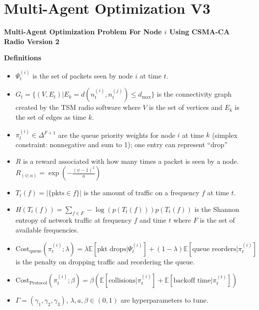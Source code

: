\documentclass{article}
\begin{document}
\newpage

\section{Multi-Agent Optimization V3}

\noindent \textbf{Multi-Agent Optimization Problem For Node $i$ Using CSMA-CA Radio Version 2}
\\
\noindent{}

\vspace{1 cm}


\textbf{Definitions}
\begin{itemize}
    \item $\Psi_{t}^{(i)}$ is the set of packets seen by node $i$ at time $t$.
    \item $G_{t} = \{ (V, E_{t}) | E_{k} = d(n_{t}^{(i)}, n_{t}^{(j)}) \le d_{\text{max}} \}$ is the connectivity graph created by the TSM radio software where $V$ is the set of vertices and $E_{k}$ is the set of edges as time $k$.
    \item $\pi_{t}^{(i)}\in\Delta^{F+1}$ are the queue priority weights for node $i$ at time $k$ (simplex constraint: nonnegative and sum to 1); one entry can represent ``drop''
    \item $R$ is a reward associated with how many times a packet is seen by a node. $R_(\psi; a) = \exp(- \frac{(\psi - 1)^{2}}{a})$
    \item $T_{t}(f) = | \{ \text{pkts} \in f\} |$ is the amount of traffic on a frequency $f$ at time $t$.
    \item $H(T_{t}(f))= \sum _{f \in F} -\log(p(T_{t}(f))) p(T_{t}(f))$ is the Shannon entropy of network traffic at frequency $f$ and time $t$ where $F$ is the set of available frequencies.
    \item $\text{Cost}_{\text{queue}}(\pi_{t}^{(i)}; \lambda) = \lambda \mathbb{E}[\text{pkt drops}| \Psi_{t}^{(i)}] + (1 - \lambda) \mathbb{E}[\text{queue reorders}| \pi_{t}^{(i)}]$ is the penalty on dropping traffic and reordering the queue.
    \item $\text{Cost}_{\text{Protocol}}(\pi_{t}^{(i)}; \beta) = \beta (\mathbb{E}[ \text{collisions} | \pi_{t}^{(i)}] + \mathbb{E}[ \text{backoff time} | \pi_{t}^{(t)}])$
    \item $\Gamma = (\gamma_{1}, \gamma_{2}, \gamma_{3})$, $\lambda, a , \beta\in (0, 1)$ are hyperparameters to tune.
\end{itemize}
\end{document}
